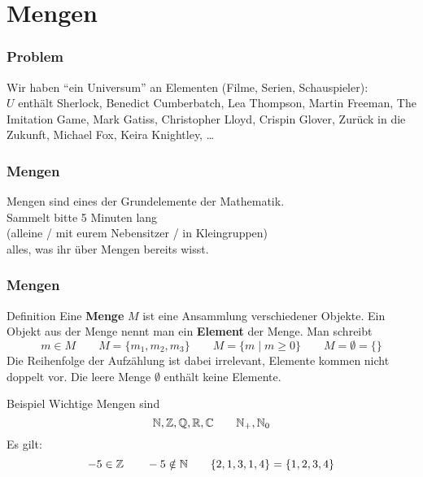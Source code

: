 \section{Mengen}


\begin{frame}
	\frametitle{Problem}
	Wir haben \enquote{ein Universum} an Elementen (Filme, Serien, Schauspieler):\\[0.5em]
	
	$U$ enthält Sherlock, Benedict Cumberbatch, Lea Thompson, Martin Freeman, The Imitation Game, Mark Gatiss, Christopher Lloyd, Crispin Glover, Zurück in die Zukunft, Michael Fox, Keira Knightley, \dots  
\end{frame}

\begin{frame}
	\frametitle{Mengen}
	Mengen sind eines der Grundelemente der Mathematik. \\[1em]
	Sammelt bitte 5 Minuten lang \\(alleine / mit eurem Nebensitzer / in Kleingruppen)\\ alles, was ihr über Mengen bereits wisst.
\end{frame}

\begin{frame}
	\frametitle{Mengen}

	\begin{block}{Definition}
		Eine \textbf{Menge} $M$ ist eine Ansammlung verschiedener Objekte. Ein Objekt aus der Menge nennt man ein \textbf{Element} der Menge. Man schreibt
		$$m \in M \qquad M = \{m_1, m_2, m_3 \} \qquad M = \{m \mid m \geq 0\} \qquad M = \emptyset = \{\} $$
		Die Reihenfolge der Aufzählung ist dabei irrelevant, Elemente kommen nicht doppelt vor. Die leere Menge $\emptyset$ enthält keine Elemente.
	\end{block}
	\pause
	
	\begin{block}{Beispiel}
		Wichtige Mengen sind
		$$\mathbb{N}, \mathbb{Z}, \mathbb{Q}, \mathbb{R}, \mathbb{C} \qquad \mathbb{N}_+, \mathbb{N}_0$$
		Es gilt: $$-5 \in \mathbb{Z} \qquad -5 \notin \mathbb{N} \qquad \{2, 1, 3, 1, 4\} = \{1, 2, 3, 4\}$$
	\end{block}
	
\end{frame}

